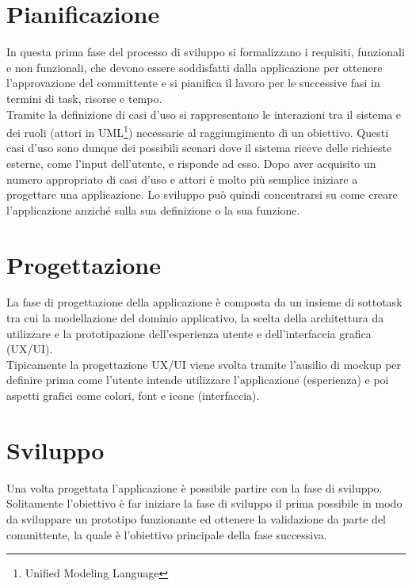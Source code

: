 \section{Pianificazione}
In questa prima fase del processo di sviluppo si formalizzano i requisiti, funzionali e non funzionali, che devono essere soddisfatti dalla applicazione per ottenere l'approvazione del committente e si pianifica il lavoro per le successive fasi in termini di task, risorse e tempo.\\
Tramite la definizione di casi d'uso si rappresentano le interazioni tra il sistema e dei ruoli (attori in UML\footnote{Unified Modeling Language}) necessarie al raggiungimento di un obiettivo. Questi casi d'uso sono dunque dei possibili scenari dove il sistema riceve delle richieste esterne, come l'input dell'utente, e risponde ad esso.
Dopo aver acquisito un numero appropriato di casi d'uso e attori è molto più semplice iniziare a progettare una applicazione. Lo sviluppo può quindi concentrarsi su come creare l'applicazione anziché sulla sua definizione o la sua funzione.

\section{Progettazione}
La fase di progettazione della applicazione è composta da un insieme di sottotask tra cui la modellazione del dominio applicativo, la scelta della architettura da utilizzare e la prototipazione dell'esperienza utente e dell'interfaccia grafica (UX/UI).\\
Tipicamente la progettazione UX/UI viene svolta tramite l'ausilio di mockup per definire prima come l'utente intende utilizzare l'applicazione (esperienza) e poi aspetti grafici come colori, font e icone (interfaccia).

\section{Sviluppo}
Una volta progettata l'applicazione è possibile partire con la fase di sviluppo. Solitamente l'obiettivo è far iniziare la fase di sviluppo il prima possibile in modo da sviluppare un prototipo funzionante ed ottenere la validazione da parte del committente, la quale è l'obiettivo principale della fase successiva.

